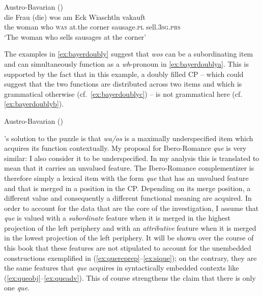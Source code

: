 \ea\label{ex:bayerd}  
Austro-Bavarian (\citealt[290: ex 26a]{Bayer2002})\\
\gll  die Frau (die) wos am Eck Wiaschtln vakauft\\
the woman who \textsc{was} at.the corner sausage.\textsc{pl} sell.\textsc{3sg.prs}\\
\glt`The woman who sells sausages at the corner' 
\z


The examples in \eqref{ex:bayerdoubly} suggest that \emph{wos} can be a subordinating item and can simultaneously  function as a \textit{wh}-pronoun in \eqref{ex:bayerdoublya}. This is supported by the fact that in this example, a doubly filled CP -- which could suggest that  the two functions are distributed  across two items and which is grammatical otherwise (cf.~\ref{ex:bayerdoublyc}) --  is not grammatical here (cf. \ref{ex:bayerdoublyb}).

\ea\label{ex:bayerdoubly}Austro-Bavarian (\citealt[4: 9a-c]{Bayer2004})
	\z
\z

\citeauthor{Bayer2004}'s solution to the puzzle is that  \emph{wa/os} is a maximally underspecified item which acquires  its function contextually.
My proposal for Ibero-Romance \emph{que} is very similar: I also consider it to be  underspecified. In my analysis this is translated to mean that it carries an unvalued feature. The Ibero-Romance complementizer is therefore simply a lexical item with the form \emph{que}  that has an unvalued  feature and that is merged in a position in the CP. Depending on its merge position, a different value and consequently a different functional meaning are acquired.  In order to account for the data that are the  core of the  investigation, I assume that \emph{que} is valued with a \emph{subordinate} feature when it is merged in the highest projection of the left periphery and with an \emph{attributive} feature when it is merged in the lowest projection of the left periphery.  It will be shown over the course of this book that these features are not stipulated to account for the  unembedded constructions exemplified in (\ref{ex:quereprep}--\ref{ex:sique});  on the contrary, they are  the same features that \emph{que} acquires in syntactically embedded contexts like (\ref{ex:queobj}--\ref{ex:queadv}). This of course strengthens the claim that there is only one  \emph{que}.

